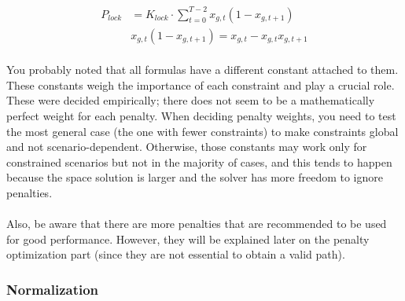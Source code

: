 \documentclass[11pt]{article}
\begin{document}
\[
\begin{aligned}
P_{lock} &= K_{lock} \cdot \sum_{t=0}^{T-2}x_{g,t}(1-x_{g,t+1}) \\ &x_{g,t}(1-x_{g,t+1})  = x_{g,t} - x_{g,t}x_{g,t+1}
\end{aligned}
\]
\\
You probably noted that all formulas have a different constant attached to them. These constants weigh the importance of each constraint and play a crucial role. These were decided empirically; there does not seem to be a mathematically perfect weight for each penalty. When deciding penalty weights, you need to test the most general case (the one with fewer constraints) to make constraints global and not scenario-dependent. Otherwise, those constants may work only for constrained scenarios but not in the majority of cases, and this tends to happen because the space solution is larger and the solver has more freedom to ignore penalties.\\
\\
Also, be aware that there are more penalties that are recommended to be used for good performance. However, they will be explained later on the penalty optimization part (since they are not essential to obtain a valid path).

\subsubsection{Normalization}
\end{document}
